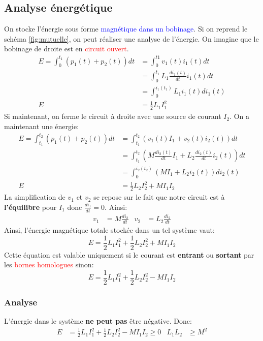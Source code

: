 \documentclass{report}
\begin{document}
\subsection{Analyse énergétique}
On stocke l'énergie sous forme \textcolor{blue}{magnétique dans un bobinage}. Si on reprend le schéma \ref{fig:mutuelle}, on peut réaliser une analyse de l'énergie. On imagine que le bobinage de droite est en \textcolor{red}{circuit ouvert}.
\begin{align*}
E = \int_0^{t_1} (p_1(t) + p_2(t)) dt &= \int_0^{t1}v_1 (t) i_1 (t) dt\\
&= \int_0^{t_1} L_1 \frac{di_1 (t)}{dt} i_1 (t) dt\\
&= \int_0^{i_1 (t_1)} L_1 i_1(t) di_1(t)\\
E &= \frac{1}{2} L_1 I_1^2
\end{align*}
Si maintenant, on ferme le circuit à droite avec une source de courant $I_2$. On a maintenant une énergie:
\begin{align*}
E = \int_{t_1}^{t_2} (p_1(t) + p_2(t)) dt &= \int_{t_1}^{t_2} (v_1 (t) I_1 + v_2(t) i_2 (t)) dt\\
&= \int_{t_1}^{t_2} \left( M \frac{di_2 (t)}{dt} I_1 + L_2 \frac{di_2 (t)}{dt} i_2 (t) \right) dt\\
&= \int_{0}^{i_2(t_2)} (M I_1 + L_2 i_2(t)) di_2(t)\\
E &= \frac{1}{2} L_2 I_2^2 + MI_1 I_2
\end{align*}
La simplification de $v_1$ et $v_2$ se repose sur le fait que notre circuit est à \textbf{l'équilibre} pour $I_1$ donc $\frac{di_1}{dt} = 0$. Ainsi:
\begin{align*}
v_1 &= M \frac{di_2}{dt} & v_2 &= L_2 \frac{di_2}{dt}
\end{align*}
Ainsi, l'énergie magnétique totale stockée dans un tel système vaut:
\begin{equation}
E = \frac{1}{2} L_1 I_1^2 + \frac{1}{2} L_2 I_2^2 + MI_1 I_2
\end{equation}
Cette équation est valable uniquement si le courant est \textbf{entrant} ou \textbf{sortant} par les \textcolor{red}{bornes homologues} sinon:
\begin{equation}
E = \frac{1}{2} L_1 I_1^2 + \frac{1}{2} L_2 I_2^2 - MI_1 I_2
\end{equation}

\subsubsection{Analyse}
L'énergie dans le système \textbf{ne peut pas} être négative. Donc:
\begin{align*}
E &= \frac{1}{2} L_1 I_1^2 + \frac{1}{2} L_2 I_2^2 - M I_1 I_2 \geqslant 0 & L_1 L_2 &\geqslant M^2
\end{align*}
\end{document}
